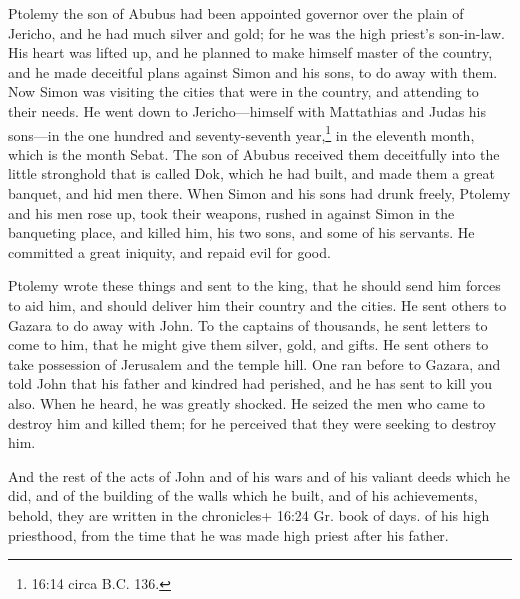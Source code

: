  Ptolemy the son of Abubus had been appointed governor over
the plain of Jericho, and he had much silver and gold;  for
he was the high priest's son-in-law.  His heart was lifted
up, and he planned to make himself master of the country, and he made
deceitful plans against Simon and his sons, to do away with them.
 Now Simon was visiting the cities that were in the
country, and attending to their needs. He went down to Jericho---himself
with Mattathias and Judas his sons---in the one hundred and
seventy-seventh year,\footnote{16:14 circa B.C. 136.} in the eleventh
month, which is the month Sebat.  The son of Abubus
received them deceitfully into the little stronghold that is called Dok,
which he had built, and made them a great banquet, and hid men there.
 When Simon and his sons had drunk freely, Ptolemy and his
men rose up, took their weapons, rushed in against Simon in the
banqueting place, and killed him, his two sons, and some of his
servants.  He committed a great iniquity, and repaid evil
for good.

 Ptolemy wrote these things and sent to the king, that he
should send him forces to aid him, and should deliver him their country
and the cities.  He sent others to Gazara to do away with
John. To the captains of thousands, he sent letters to come to him, that
he might give them silver, gold, and gifts.  He sent others
to take possession of Jerusalem and the temple hill.  One
ran before to Gazara, and told John that his father and kindred had
perished, and he has sent to kill you also.  When he heard,
he was greatly shocked. He seized the men who came to destroy him and
killed them; for he perceived that they were seeking to destroy him.

 And the rest of the acts of John and of his wars and of
his valiant deeds which he did, and of the building of the walls which
he built, and of his achievements,  behold, they are
written in the chronicles+ 16:24 Gr. book of days. of his high
priesthood, from the time that he was made high priest after his father.
